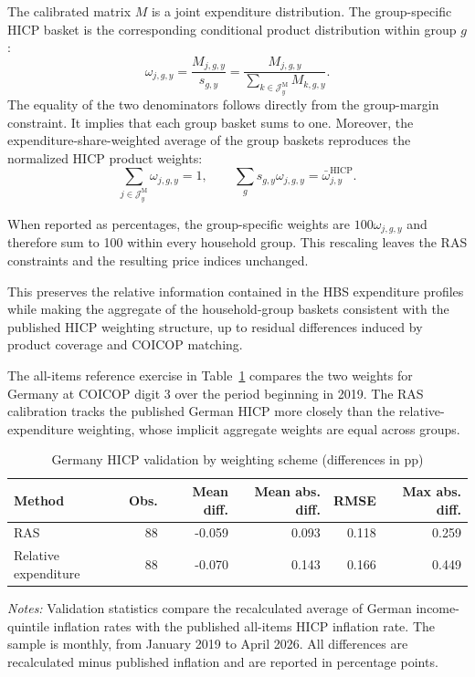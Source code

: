 \documentclass[11pt]{article}
\begin{document}
The calibrated matrix $M$ is a joint expenditure distribution. The group-specific HICP basket is
the corresponding conditional product distribution within group $g$:
\begin{equation}
\omega_{j,g,y}
=
\frac{M_{j,g,y}}{s_{g,y}}
=
\frac{M_{j,g,y}}{\sum_{k \in \mathcal{J}_y^{\mathrm M}}M_{k,g,y}}.
\end{equation}
The equality of the two denominators follows directly from the group-margin constraint. It implies
that each group basket sums to one. Moreover, the expenditure-share-weighted average of the group
baskets reproduces the normalized HICP product weights:
\begin{equation}
\sum_{j \in \mathcal{J}_y^{\mathrm M}}\omega_{j,g,y}=1,
\qquad
\sum_g s_{g,y}\omega_{j,g,y}
=
\bar{\omega}^{\mathrm{HICP}}_{j,y}.
\end{equation}

When reported as percentages, the group-specific weights are $100\omega_{j,g,y}$ and therefore sum
to 100 within every household group. This rescaling leaves the RAS constraints and the resulting
price indices unchanged.

This preserves the relative information contained in the HBS expenditure profiles while making the
aggregate of the household-group baskets consistent with the published HICP weighting structure, up
to residual differences induced by product coverage and COICOP matching.

The all-items reference exercise in Table~\ref{tab:de-normalization-validation} compares the two weights for Germany at COICOP digit 3
over the period beginning in 2019. The RAS
calibration tracks the published German HICP more closely than the relative-expenditure weighting, whose implicit aggregate weights are equal across groups.%

\begin{table}[H]
\centering
\caption{\label{tab:de-normalization-validation}Germany HICP validation by weighting scheme (differences in pp)}
\small
\begin{tabular}{lrrrrr}
\toprule
Method & Obs. & Mean diff. & Mean abs. diff. & RMSE & Max abs. diff. \\
\midrule
RAS & 88 & -0.059 & 0.093 & 0.118 & 0.259 \\
Relative expenditure & 88 & -0.070 & 0.143 & 0.166 & 0.449 \\
\bottomrule
\end{tabular}
\begin{minipage}{0.86\textwidth}
\footnotesize
\emph{Notes:} Validation statistics compare the recalculated average of German
income-quintile inflation rates with the published all-items HICP inflation
rate. The sample is monthly, from January 2019 to April 2026. All differences
are recalculated minus published inflation and are reported in percentage
points.
\end{minipage}
\end{table}
\end{document}

